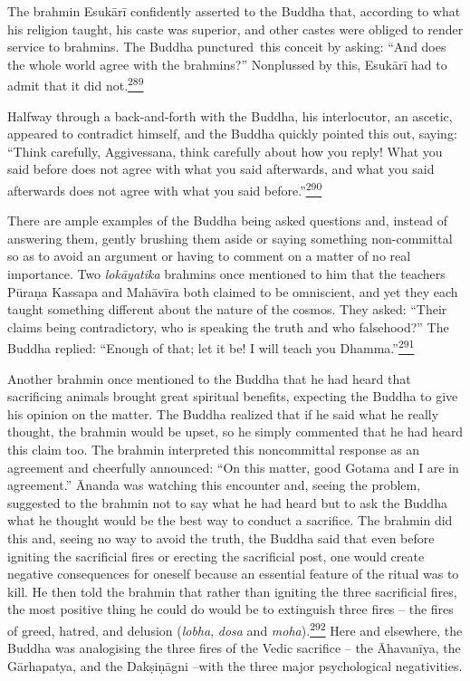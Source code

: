 The brahmin Esukārī confidently asserted to the Buddha that, according
to what his religion taught, his caste was superior, and other castes
were obliged to render service to brahmins. The Buddha punctured~this
conceit by asking: ``And does the whole world agree with the brahmins?''
Nonplussed by this, Esukārī had to admit that it did
not.\label{footprints_split_010.html_fnref289}\hyperref[footprints_split_024.htmlux5cux23fn289]{\textsuperscript{289}}

Halfway through a back-and-forth with the Buddha, his interlocutor, an
ascetic, appeared to contradict himself, and the Buddha quickly pointed
this out, saying: ``Think carefully, Aggivessana, think carefully about
how you reply! What you said before does not agree with what you said
afterwards, and what you said afterwards does not agree with what you
said
before.''\label{footprints_split_010.html_fnref290}\hyperref[footprints_split_024.htmlux5cux23fn290]{\textsuperscript{290}}

There are ample examples of the Buddha being asked questions and,
instead of answering them, gently brushing them aside or saying
something non-committal so as to avoid an argument or having to comment
on a matter of no real importance. Two \emph{lokāyatika} brahmins once
mentioned to him that the teachers Pūraṇa Kassapa and Mahāvīra both
claimed to be omniscient, and yet they each taught something different
about the nature of the cosmos. They asked: ``Their claims being
contradictory, who is speaking the truth and who falsehood?'' The Buddha
replied: ``Enough of that; let it be! I will teach you
Dhamma.''\label{footprints_split_010.html_fnref291}\hyperref[footprints_split_024.htmlux5cux23fn291]{\textsuperscript{291}}

Another brahmin once mentioned to the Buddha that he had heard that
sacrificing animals brought great spiritual benefits, expecting the
Buddha to give his opinion on the matter. The Buddha realized that if he
said what he really thought, the brahmin would be upset, so he simply
commented that he had heard this claim too. The brahmin interpreted this
noncommittal response as an agreement and cheerfully announced: ``On
this matter, good Gotama and I are in agreement.'' Ānanda was watching
this encounter and, seeing the problem, suggested to the brahmin not to
say what he had heard but to ask the Buddha what he thought would be the
best way to conduct a sacrifice. The brahmin did this and, seeing no way
to avoid the truth, the Buddha said that even before igniting the
sacrificial fires or erecting the sacrificial post, one would create
negative consequences for oneself because an essential feature of the
ritual was to kill. He then told the brahmin that rather than igniting
the three sacrificial fires, the most positive thing he could do would
be to extinguish three fires -- the fires of greed, hatred, and delusion
(\emph{lobha}, \emph{dosa} and
\emph{moha}).\label{footprints_split_010.html_fnref292}\hyperref[footprints_split_024.htmlux5cux23fn292]{\textsuperscript{292}}
Here and elsewhere, the Buddha was analogising the three fires of the
Vedic sacrifice -- the Āhavanīya, the Gārhapatya, and the Dakṣiṇāgni
--with the three major psychological negativities.

